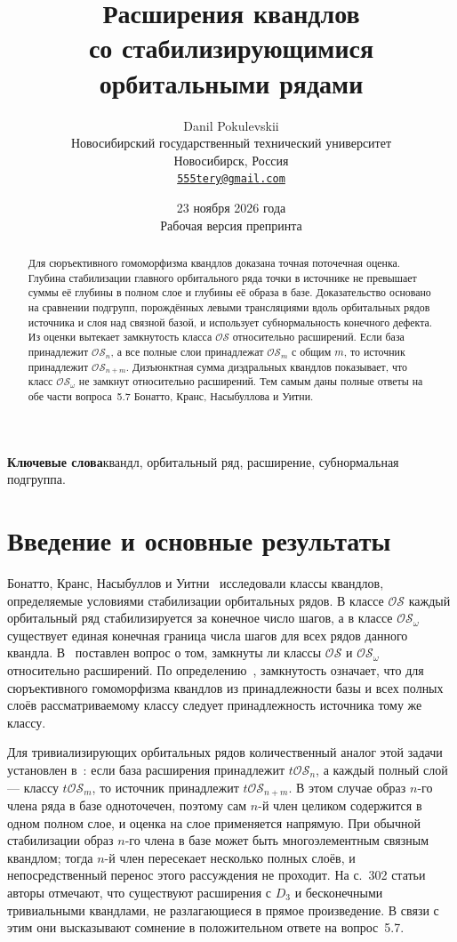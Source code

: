\documentclass[11pt,a4paper]{article}
\title{Расширения квандлов\\со стабилизирующимися орбитальными рядами}
\author{Danil Pokulevskii\\[3pt]
  \small Новосибирский государственный технический университет\\
  \small Новосибирск, Россия\\
  \small\href{mailto:555tery@gmail.com}{\texttt{555tery@gmail.com}}}
\date{23 ноября 2026 года\\[2pt]\small Рабочая версия препринта}
\theoremstyle{remark}
\newcommand{\OS}{\mathcal{OS}}
\newcommand{\tOS}{t\mathcal{OS}}
\begin{document}
\maketitle

\begin{abstract}
Для сюръективного гомоморфизма квандлов доказана точная поточечная оценка.
Глубина стабилизации главного орбитального ряда точки в источнике не
превышает суммы её глубины в полном слое и глубины её образа в базе.
Доказательство основано на сравнении подгрупп, порождённых левыми
трансляциями вдоль орбитальных рядов источника и слоя над связной базой,
и использует субнормальность конечного дефекта. Из оценки вытекает
замкнутость класса \(\OS\) относительно расширений. Если база принадлежит
\(\OS_n\), а все полные слои принадлежат \(\OS_m\) с общим \(m\), то
источник принадлежит \(\OS_{n+m}\). Дизъюнктная сумма диэдральных квандлов
показывает, что класс \(\OS_\omega\) не замкнут относительно расширений.
Тем самым даны полные ответы на обе части вопроса~5.7 Бонатто, Кранс,
Насыбуллова и Уитни.
\end{abstract}

\noindent\textbf{Ключевые слова}\quad квандл, орбитальный ряд, расширение,
субнормальная подгруппа.

\section{Введение и основные результаты}

Бонатто, Кранс, Насыбуллов и Уитни~\cite[раздел~4.1]{BCNW} исследовали
классы квандлов, определяемые условиями стабилизации орбитальных рядов.
В классе \(\OS\) каждый орбитальный ряд стабилизируется за конечное число
шагов, а в классе \(\OS_\omega\) существует единая конечная граница числа
шагов для всех рядов данного квандла. В~\cite[вопрос~5.7, с.~301]{BCNW}
поставлен вопрос о том, замкнуты ли классы \(\OS\) и \(\OS_\omega\)
относительно расширений. По определению~\cite[раздел~2.2]{BCNW},
замкнутость означает, что для сюръективного гомоморфизма квандлов из
принадлежности базы и всех полных слоёв рассматриваемому классу следует
принадлежность источника тому же классу.

Для тривиализирующих орбитальных рядов количественный аналог этой задачи
установлен в~\cite[лемма~5.5]{BCNW}: если база расширения принадлежит
\(\tOS_n\), а каждый полный слой --- классу \(\tOS_m\), то источник
принадлежит \(\tOS_{n+m}\). В этом случае образ \(n\)-го члена ряда в
базе одноточечен, поэтому сам \(n\)-й член целиком содержится в одном
полном слое, и оценка на слое применяется напрямую. При обычной
стабилизации образ \(n\)-го члена в базе может быть многоэлементным
связным квандлом; тогда \(n\)-й член пересекает несколько полных слоёв,
и непосредственный перенос этого рассуждения не проходит.
На с.~302 статьи~\cite{BCNW} авторы отмечают, что существуют расширения
с \(D_3\) и бесконечными тривиальными квандлами, не разлагающиеся в прямое
произведение. В связи с этим они высказывают сомнение в положительном
ответе на вопрос~5.7.
\end{document}
